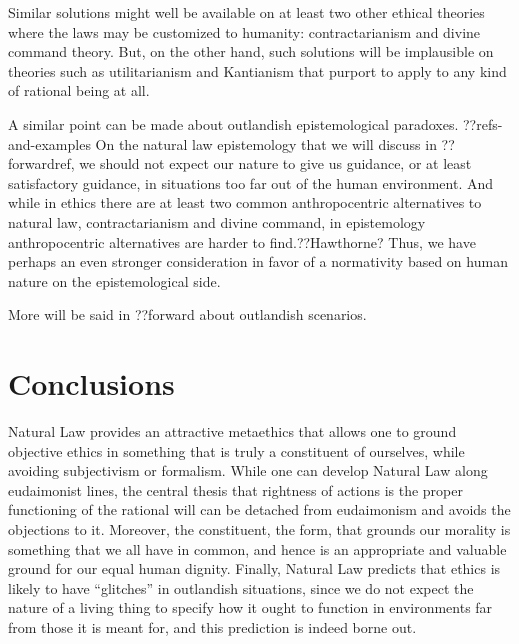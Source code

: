 Similar solutions might well be available on at least two other ethical theories where the laws may be customized
to humanity: contractarianism and divine command theory. But, on the other hand, such solutions will be
implausible on theories such as utilitarianism and Kantianism that purport to apply to any kind of rational being at all. 

A similar point can be made about outlandish epistemological paradoxes. ??refs-and-examples  On the natural law epistemology that we will discuss in ??forwardref, we should not expect our nature to give us guidance, or at least satisfactory guidance, 
in situations too far out of the human environment. And while in ethics there are at least two common anthropocentric alternatives to natural law, contractarianism and divine command, in epistemology anthropocentric alternatives are harder to find.??Hawthorne?
Thus, we have perhaps an even stronger consideration in favor of a normativity based on human nature on the epistemological
side. 

More will be said in ??forward about outlandish scenarios.

\section{Conclusions}
Natural Law provides an attractive metaethics that allows one to ground objective ethics in something that is truly
a constituent of ourselves, while avoiding subjectivism or formalism. 
While one can develop Natural Law along eudaimonist lines, the central thesis that rightness of actions is
the proper functioning of the rational will can be detached from eudaimonism and avoids the objections to it.
Moreover, the constituent, the form, that grounds our morality is something that we all have in common, and 
hence is an appropriate and valuable ground for our equal human dignity. Finally, Natural Law predicts that
ethics is likely to have ``glitches'' in outlandish situations, since we do not expect the nature of a living
thing to specify how it ought to function in environments far from those it is meant for, and this prediction
is indeed borne out.

\chaptertail 
